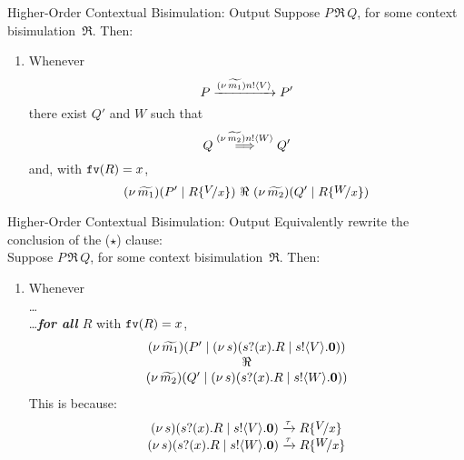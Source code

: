 \documentclass{beamer}
\begin{document}
	\begin{frame}{Higher-Order Contextual Bisimulation: Output}
		Suppose $P \,\Re\, Q$, for some context bisimulation~$\Re$. Then:
		\begin{enumerate}[$(\star)$]
			\item	Whenever
				\[
					P \xrightarrow{(\nu\, \widetilde{m_1}) n ! \langle V \rangle} P'
				\]
				there exist $Q'$ and $W$ such that 
				\[
					Q \stackrel{(\nu\, \widetilde{m_2}) n ! \langle W \rangle}{\Longrightarrow} Q'
				\]
				and,   with $\mathtt{fv}(R)=x$, 
				\[
					\newsp{\widetilde{m_1}}{P' \Par R\subst{V}{x}}\ \Re\ \newsp{\widetilde{m_2}}{Q' \Par R\subst{W}{x}}
				\]
		\end{enumerate}
	\end{frame}

	\begin{frame}{Higher-Order Contextual Bisimulation: Output}
		Equivalently rewrite the conclusion of the ($\star$) clause:
		\\[2mm]

		Suppose $P \,\Re\, Q$, for some context bisimulation~$\Re$. Then:
		\begin{enumerate}[$(\star)$]
			\item	Whenever\\
				\dots\\
				\dots \emph{\textbf{for all} $R$}  with $\mathtt{fv}(R)=x$, 
				\[
					\begin{array}{c}
						(\nu\, \widetilde{m_1})(P' \;|\; (\nu\, s)(s ? (x) . R \;|\;  s ! \langle V \rangle . \mathbf{0}))
						\\
						\Re
						\\
						(\nu\, \widetilde{m_2})(Q' \;|\; (\nu\, s)(s ? (x) . R \;|\; s ! \langle W \rangle . \mathbf{0}))
					\end{array}
				\]
				This is because:
				\[
					\begin{array}{c}
						\newsp{s}{\binp{s}{x} R \Par \bout{s}{V} \inact}
						\by{\tau}
						R \subst{V}{x}
						\\
						\newsp{s}{\binp{s}{x} R \Par \bout{s}{W} \inact}
						\by{\tau}
						R \subst{W}{x}
					\end{array}
				\]
		\end{enumerate}
	\end{frame}
\end{document}
